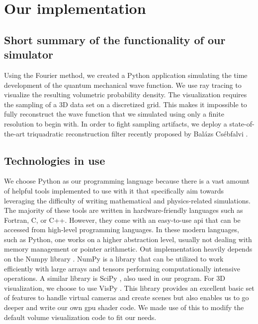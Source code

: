 \section{Our implementation}
\label{sec:our_implementation}

\subsection{Short summary of the functionality of our simulator}

Using the Fourier method, we created a Python application simulating the time development of the quantum mechanical wave function.
We use ray tracing to visualize the resulting volumetric probability density.
The visualization requires the sampling of a 3D data set on a discretized grid.
This makes it impossible to fully reconstruct the wave function that we simulated using only a finite resolution to begin with.
In order to fight sampling artifacts, we deploy a state-of-the-art triquadratic reconstruction filter recently proposed by Balázs Csébfalvi \cite{csebfalvi2023}.

\subsection{Technologies in use}

We choose Python \cite{van1995python} as our programming language because there is a vast amount of helpful tools implemented to use with it that specifically aim towards leveraging the difficulty of writing mathematical and physics-related simulations.
The majority of these tools are written in hardware-friendly languages such as Fortran, C, or C++.
However, they come with an easy-to-use \acrfull{api} that can be accessed from high-level programming languages.
In these modern languages, such as Python, one works on a higher abstraction level, usually not dealing with memory management or pointer arithmetic.
Out implementation heavily depends on the Numpy library \cite{harris2020array}.
NumPy is a library that can be utilized to work efficiently with large arrays and tensors performing computationally intensive operations.
A similar library is SciPy \cite{2020SciPy-NMeth}, also used in our program.
For 3D visualization, we choose to use VisPy \cite{vispy}.
This library provides an excellent basic set of features to handle virtual cameras and create scenes but also enables us to go deeper and write our own \acrshort{gpu} shader code.
We made use of this to modify the default volume visualization code to fit our needs.


